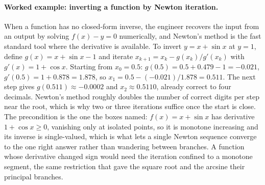 \paragraph{Worked example: inverting a function by Newton iteration.}
When a function has no closed-form inverse, the engineer recovers the
input from an output by solving $f(x) - y = 0$ numerically, and
Newton's method is the fast standard tool where the derivative is
available. To invert $y = x + \sin x$ at $y = 1$, define $g(x) =
x + \sin x - 1$ and iterate $x_{k+1} = x_k - g(x_k)/g'(x_k)$ with
$g'(x) = 1 + \cos x$. Starting from $x_0 = 0.5$: $g(0.5) = 0.5 +
0.479 - 1 = -0.021$, $g'(0.5) = 1 + 0.878 = 1.878$, so $x_1 = 0.5 -
(-0.021)/1.878 = 0.511$. The next step gives $g(0.511) \approx
-0.0002$ and $x_2 \approx 0.5110$, already correct to four decimals.
Newton's method roughly doubles the number of correct digits per step
near the root, which is why two or three iterations suffice once the
start is close. The precondition is the one the boxes named:
$f(x) = x + \sin x$ has derivative $1 + \cos x \geq 0$, vanishing only
at isolated points, so it is monotone increasing and its inverse is
single-valued, which is what lets a single Newton sequence converge to
the one right answer rather than wandering between branches. A function
whose derivative changed sign would need the iteration confined to a
monotone segment, the same restriction that gave the square root and
the arcsine their principal branches.

